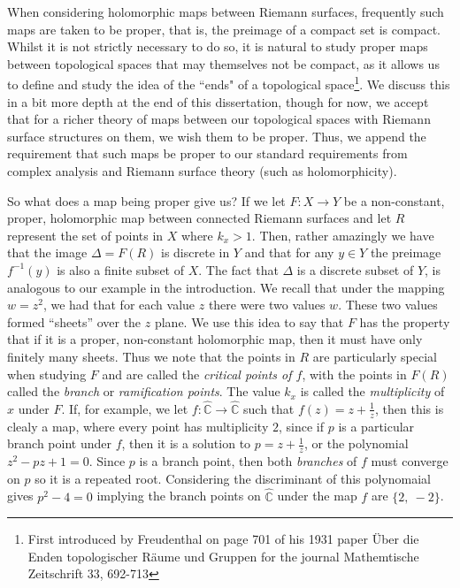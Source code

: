 \documentclass[11pt]{report}
\theoremstyle{definition}
\begin{document}
When considering holomorphic maps between Riemann surfaces, frequently such maps are taken to be proper, that is, the preimage of a compact set is compact. Whilst it is not strictly necessary to do so, it is natural to study proper maps between topological spaces that may themselves not be compact, as it allows us to define and study the idea of the ``ends" of a topological space\footnote{First introduced by Freudenthal on page 701 of his 1931 paper \"{U}ber die Enden topologischer R\"{a}ume und Gruppen for the journal Mathemtische Zeitschrift 33, 692-713}. We discuss this in a bit more depth at the end of this dissertation, though for now, we accept that for a richer theory of maps between our topological spaces with Riemann surface structures on them, we wish them to be proper. Thus, we append the requirement that such maps be proper to our standard requirements from complex analysis and Riemann surface theory (such as holomorphicity). 

So what does a map being proper give us? If we let $F:X \rightarrow Y$ be a non-constant, proper, holomorphic map between connected Riemann surfaces and let $R$ represent the set of points in $X$ where $k_x > 1$. Then, rather amazingly we have that the image $\Delta = F(R)$ is discrete in $Y$ and that for any $y \in Y$ the preimage $f^{-1}(y)$ is also a finite subset of $X$. The fact that $\Delta$ is a discrete subset of $Y$, is analogous to our example in the introduction. We recall that under the mapping $w=z^2$, we had that for each value $z$ there were two values $w$. These two values formed ``sheets'' over the $z$ plane. We use this idea to say that $F$ has the property that if it is a proper, non-constant holomorphic map, then it must have only finitely many sheets. Thus we note that the points in $R$ are particularly special when studying $F$ and are called the \emph{critical points of $f$}, with the points in $F(R)$ called the \emph{branch} or \emph{ramification points}. The value $k_x$ is called the \emph{multiplicity} of $x$ under $F$. If, for example, we let $f:\widehat{\mathbb{C}}\rightarrow \widehat{\mathbb{C}}$ such that $f(z) = z + \frac{1}{z}$, then this is clealy a map, where every point has multiplicity $2$, since if $p$ is a particular branch point under $f$, then it is a solution to $p=z + \frac{1}{z}$, or the polynomial $z^2 -pz + 1=0$. Since $p$ is a branch point, then both \emph{branches} of $f$ must converge on $p$ so it is a repeated root. Considering the discriminant of this polynomaial gives $p^2 - 4 = 0$ implying the branch points on $\widehat{\mathbb{C}}$ under the map $f$ are $\{2,\ -2\}$.
\end{document}
